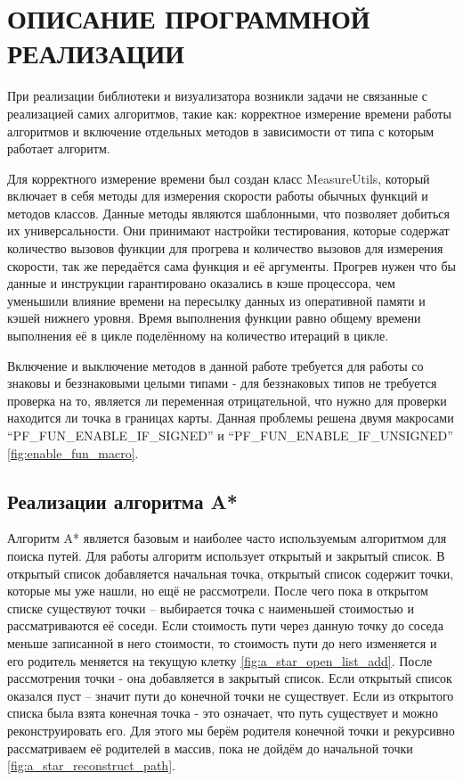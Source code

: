 \section[Описание программной реализации]{\MakeTextUppercase{ОПИСАНИЕ ПРОГРАММНОЙ РЕАЛИЗАЦИИ}}

\vspace{1\baselineskip} 

При реализации библиотеки и визуализатора возникли задачи не связанные с реализацией самих алгоритмов, такие как: корректное измерение времени работы алгоритмов и включение отдельных методов в зависимости от типа с которым работает алгоритм.

Для корректного измерение времени был создан класс MeasureUtils, который включает в себя методы для измерения скорости работы обычных функций и методов классов. Данные методы являются шаблонными, что позволяет добиться их универсальности. Они принимают настройки тестирования, которые содержат количество вызовов функции для прогрева и количество вызовов для измерения скорости, так же передаётся сама функция и её аргументы. Прогрев нужен что бы данные и инструкции гарантировано оказались в кэше процессора, чем уменьшили влияние времени на пересылку данных из оперативной памяти и кэшей нижнего уровня. Время выполнения функции равно общему времени выполнения её в цикле поделённому на количество итераций в цикле.

Включение и выключение методов в данной работе требуется для работы со знаковы и беззнаковыми целыми типами - для беззнаковых типов не требуется проверка на то, является ли переменная отрицательной, что нужно для проверки находится ли точка в границах карты. Данная проблемы решена двумя макросами  ``PF\_FUN\_ENABLE\_IF\_SIGNED'' и ``PF\_FUN\_ENABLE\_IF\_UNSIGNED'' \cref{fig:enable_fun_macro}.


\subsection{Реализации алгоритма A*}

Алгоритм A* является базовым и наиболее часто используемым алгоритмом для поиска путей. Для работы алгоритм использует открытый и закрытый список. В открытый список добавляется начальная точка, открытый список содержит точки, которые мы уже нашли, но ещё не рассмотрели. После чего пока в открытом списке существуют точки -- выбирается точка с наименьшей стоимостью и рассматриваются её соседи. Если стоимость пути через данную точку до соседа меньше записанной в него стоимости, то стоимость пути до него изменяется и его родитель меняется на текущую клетку \cref{fig:a_star_open_list_add}. После рассмотрения точки - она добавляется в закрытый список. Если открытый список оказался пуст -- значит пути до конечной точки не существует. Если из открытого списка была взята конечная точка - это означает, что путь существует и можно реконструировать его. Для этого мы берём родителя конечной точки и рекурсивно рассматриваем её родителей в массив, пока не дойдём до начальной точки \cref{fig:a_star_reconstruct_path}.

